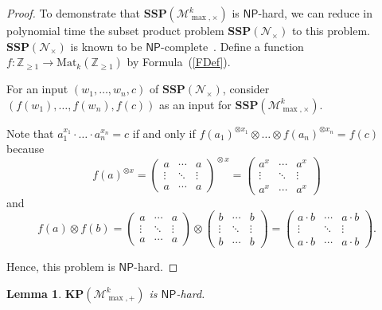 \documentclass[reqno,12pt]{amsart}
\newtheorem{lemma}{Lemma}
\theoremstyle{definition}
\newcommand{\Mat}{\mathrm{Mat}}
\newcommand{\NP}{\mathsf{NP}}
\newcommand{\MP}{\mathcal{M}_{\max, {+}}^k}
\newcommand{\MT}{\mathcal{M}_{\max, {\times}}^k}
\newcommand{\ZT}{\mathcal{N}_{\times}}
\newcommand{\SPP}{\mathbf{SSP}(\ZT)}
\newcommand{\SSMTP}{\mathbf{SSP}(\MT)}
\newcommand{\KMPP}{\mathbf{KP}(\MP)}
\begin{document}
\begin{proof}
To demonstrate that $\SSMTP$ is $\NP$-hard, we can reduce in polynomial time the subset product problem $\SPP$ to this problem. $\SPP$ is known to be $\NP$-complete~\cite[Problem SP14]{GareyJohnson1979}.
Define a function $f\colon \mathbb{Z}_{\geq 1} \to \Mat_k(\mathbb{Z}_{{\geq 1}})$ by Formula~(\ref{FDef}).

For an input $(w_1, \ldots, w_n, c)$ of $\SPP$, consider $(f(w_1), \ldots, f(w_n), f(c))$ as an input for $\SSMTP$.

Note that $a_1^{x_1} \cdot \ldots \cdot  a_n^{x_n} = c$ if and only if
$f(a_1)^{\otimes x_1} \otimes \ldots \otimes f(a_n)^{\otimes x_n} = f(c)$ because
$$
f(a)^{\otimes x} = 
\begin{pmatrix}
a      & \cdots & a \\
\vdots & \ddots & \vdots \\
a      & \cdots & a      
\end{pmatrix}^{\!\!\otimes x} 
= 
\begin{pmatrix}
a^x      & \cdots & a^x \\
\vdots & \ddots & \vdots \\
a^x      & \cdots & a^x      
\end{pmatrix}
$$
and
\begin{equation*}
f(a) \otimes f(b) = 
\begin{pmatrix}
a      & \cdots & a \\
\vdots & \ddots & \vdots \\
a      & \cdots & a      
\end{pmatrix}
\otimes
\begin{pmatrix}
b      & \cdots & b \\
\vdots & \ddots & \vdots \\
b      & \cdots & b      
\end{pmatrix} 
=
\begin{pmatrix}
a\cdot b      & \cdots & a\cdot b \\
\vdots & \ddots & \vdots \\
a\cdot b      & \cdots & a\cdot b      
\end{pmatrix}.
\end{equation*}

Hence, this problem is $\NP$-hard.
\end{proof}

\begin{lemma}\label{Lemma23}
$\KMPP$ is $\NP$-hard.
\end{lemma}
\end{document}
